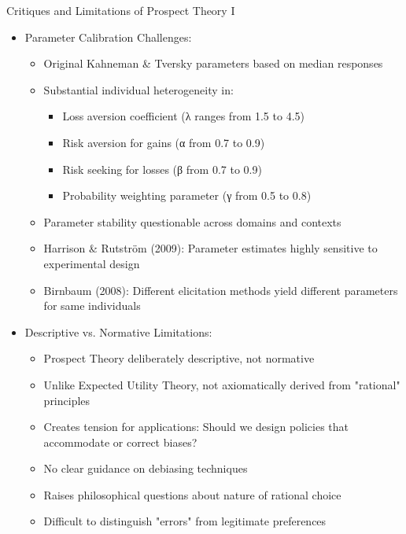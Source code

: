 \documentclass[10pt,handout]{beamer}
\begin{document}
\begin{frame}{Critiques and Limitations of Prospect Theory I}
  \begin{itemize}[<+->]
    \item Parameter Calibration Challenges:
      \begin{itemize}
        \item Original Kahneman \& Tversky parameters based on median responses
        \item Substantial individual heterogeneity in:
          \begin{itemize}
            \item Loss aversion coefficient (λ ranges from 1.5 to 4.5)
            \item Risk aversion for gains (α from 0.7 to 0.9)
            \item Risk seeking for losses (β from 0.7 to 0.9)
            \item Probability weighting parameter (γ from 0.5 to 0.8)
          \end{itemize}
        \item Parameter stability questionable across domains and contexts
        \item Harrison \& Rutström (2009): Parameter estimates highly sensitive to experimental design
        \item Birnbaum (2008): Different elicitation methods yield different parameters for same individuals
      \end{itemize}
    \item Descriptive vs. Normative Limitations:
      \begin{itemize}
        \item Prospect Theory deliberately descriptive, not normative
        \item Unlike Expected Utility Theory, not axiomatically derived from "rational" principles
        \item Creates tension for applications: Should we design policies that accommodate or correct biases?
        \item No clear guidance on debiasing techniques
        \item Raises philosophical questions about nature of rational choice
        \item Difficult to distinguish "errors" from legitimate preferences
      \end{itemize}
  \end{itemize}
\end{frame}
\end{document}
